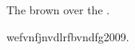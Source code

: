 \documentclass[a4paper,14pt]{extreport}
\begin{document}
\clearpage











\newpage
The  brown   over the  .




\newpage
\begin{thebibliography}{9}
	 wefvnfjnvdlrfbvndfg2009.
\end{thebibliography}
\end{document}
